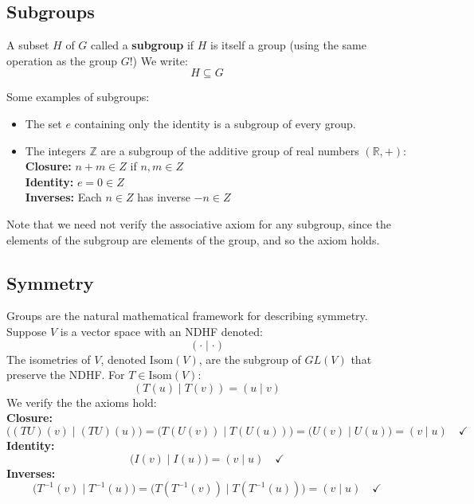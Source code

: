 \documentclass[12pt]{article}
\begin{document}
\subsection*{Subgroups}

A subset $H$ of $G$ called a \textbf{subgroup} if $H$ is itself a
group (using the same operation as the group $G$!)  We write:
$$H \subseteq G$$

\noindent
Some examples of subgroups:
\begin{itemize}
  \item The set ${e}$ containing only the identity is a subgroup of
    every group.  
  \item The integers $\mathbb{Z}$ are a subgroup of the additive group of real numbers $(\mathbb{R}, +)$:\\[5pt]
    \textbf{Closure:} $n + m  \in Z$ if $n,m \in Z$ \\
    \textbf{Identity:} $e = 0 \in Z$ \\
    \textbf{Inverses:} Each $n \in Z$ has inverse $-n \in Z$ 
\end{itemize}    
Note that we need not verify the associative axiom for any subgroup, since the elements of the subgroup are elements of the group, and so the axiom holds.

\subsection*{Symmetry}

Groups are the natural mathematical framework for describing symmetry.
Suppose $V$ is a vector space with an NDHF denoted:
$$(\cdot \mid \cdot)$$
The isometries of $V$, denoted $\mathrm{Isom}(V)$, are the subgroup of $GL(V)$
that preserve the NDHF.  For $T \in \mathrm{Isom}(V)$:
$$(T(u) \mid T(v)) = (u \mid v)$$
We verify the the axioms hold:\\
\textbf{Closure:}
\begin{equation*}
  \bigl((TU)(v) \mid (TU)(u)\bigr)
  = \bigl(T(U(v)) \mid T(U(u))\bigr)
  = \bigl(U(v) \mid U(u)\bigr)
  = (v \mid u) \quad \checkmark
\end{equation*}
\textbf{Identity:}
\begin{equation*}
  \bigl(I(v) \mid I(u)\bigr) = (v \mid u) \quad \checkmark
\end{equation*}
\textbf{Inverses:}
\begin{equation*}
  \bigl(T^{-1}(v) \mid T^{-1}(u)\bigr)
  = \bigl(T(T^{-1}(v)) \mid T(T^{-1}(u))\bigr)
  = (v \mid u) \quad \checkmark
\end{equation*}
\end{document}
